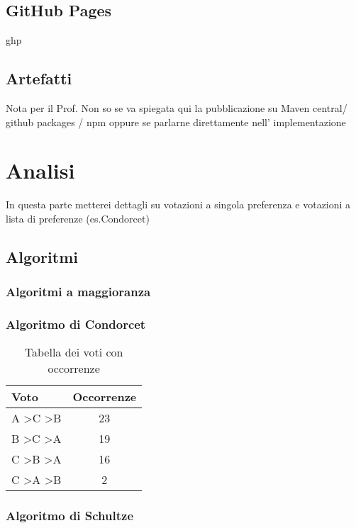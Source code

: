 \documentclass[12pt,a4paper,openright,twoside]{book}
\begin{document}
\section{GitHub Pages}
 \ac{ghp}
\section{Artefatti}
    Nota per il Prof.
    Non so se va spiegata qui la pubblicazione su Maven central/ github packages / npm
    oppure se parlarne direttamente nell' implementazione
\chapter{Analisi}
In questa parte metterei dettagli su votazioni a singola preferenza 
e votazioni a lista di preferenze (es.Condorcet)
\section{Algoritmi}
\subsection{Algoritmi a maggioranza}
\subsection{Algoritmo di Condorcet}
\begin{table}[]
    \centering
    \begin{tabular}{|c|c|}
    \hline
    \multicolumn{1}{|l|}{Voto}      & \multicolumn{1}{l|}{Occorrenze} \\ \hline
    A \textgreater C \textgreater B & 23                              \\ \hline
    B \textgreater C \textgreater A & 19                              \\ \hline
    C \textgreater B \textgreater A & 16                              \\ \hline
    C \textgreater A \textgreater B & 2                               \\ \hline
    \end{tabular}
    \caption{Tabella dei voti con occorrenze}
    \end{table}
\subsection{Algoritmo di Schultze}
\end{document}
